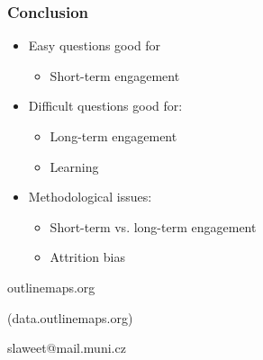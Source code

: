 \documentclass[bigger]{beamer}
\begin{document}
\begin{frame}
  \frametitle{Conclusion}
	\begin{itemize}
		\item Easy questions good for
    \begin{itemize}
      \item Short-term engagement
    \end{itemize}
		\item Difficult questions good for:
    \begin{itemize}
      \item Long-term engagement
      \item Learning 
    \end{itemize}
		\item Methodological issues:
    \begin{itemize}
      \item Short-term vs. long-term engagement
      \item Attrition bias
    \end{itemize}
	\end{itemize}

\end{frame}




\begin{frame}
	\begin{center}
		{\Huge outlinemaps.org}

		\medskip
		(data.outlinemaps.org)

		\bigskip
		\bigskip
		slaweet@mail.muni.cz
	\end{center}
\end{frame}
\end{document}
